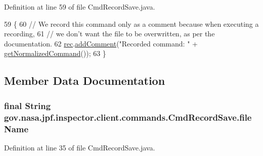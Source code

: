 Definition at line 59 of file Cmd\+Record\+Save.\+java.


\begin{DoxyCode}
59                                                   \{
60     \textcolor{comment}{// We record this command only as a comment because when executing a recording,}
61     \textcolor{comment}{// we don't want the file to be overwritten, as per the documentation.}
62     \hyperlink{classgov_1_1nasa_1_1jpf_1_1inspector_1_1client_1_1_client_command_af4246f2427035c72a6af45a2c61361f7}{rec}.\hyperlink{classgov_1_1nasa_1_1jpf_1_1inspector_1_1client_1_1_command_recorder_adee55e2460cc05a8acf16a7b0c89d3bd}{addComment}(\textcolor{stringliteral}{"Recorded command: "} + \hyperlink{classgov_1_1nasa_1_1jpf_1_1inspector_1_1client_1_1commands_1_1_cmd_record_save_afcaba982f5ef984c6782233a45a8cd71}{getNormalizedCommand}());
63   \}
\end{DoxyCode}


\subsection{Member Data Documentation}
\subsubsection[{\texorpdfstring{file\+Name}{fileName}}]{\setlength{\rightskip}{0pt plus 5cm}final String gov.\+nasa.\+jpf.\+inspector.\+client.\+commands.\+Cmd\+Record\+Save.\+file\+Name\hspace{0.3cm}{\ttfamily [private]}}\hypertarget{classgov_1_1nasa_1_1jpf_1_1inspector_1_1client_1_1commands_1_1_cmd_record_save_a7dbe446c5de22c4c43ae96f83044ac03}{}\label{classgov_1_1nasa_1_1jpf_1_1inspector_1_1client_1_1commands_1_1_cmd_record_save_a7dbe446c5de22c4c43ae96f83044ac03}


Definition at line 35 of file Cmd\+Record\+Save.\+java.

